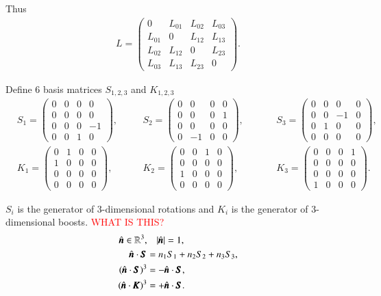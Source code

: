 Thus
\begin{align*}
   L = \begin{pmatrix} 0 & L_{01} & L_{02} & L_{03} \\ L_{01} & 0 & L_{12} & L_{13} \\ L_{02} & L_{12} & 0 & L_{23} \\ L_{03} & L_{13} & L_{23} & 0\end{pmatrix}.
\end{align*}

Define 6 basis matrices $S_{1,2,3}$ and $K_{1,2,3}$
\begin{align*}
   &S_1 = \begin{pmatrix} 0&0&0&0 \\ 0&0&0&0 \\ 0&0&0&-1 \\ 0&0&1&0\end{pmatrix}, \quad 
   &&S_2 = \begin{pmatrix} 0&0&0&0 \\ 0&0&0&1 \\ 0&0&0&0 \\ 0&-1&0&0\end{pmatrix}, \quad
   &&&S_3 = \begin{pmatrix} 0&0&0&0 \\ 0&0&-1&0 \\ 0&1&0&0 \\ 0&0&0&0\end{pmatrix}, \\
   &K_1 = \begin{pmatrix} 0&1&0&0 \\ 1&0&0&0 \\ 0&0&0&0 \\ 0&0&0&0\end{pmatrix}, \quad 
   &&K_2 = \begin{pmatrix} 0&0&1&0 \\ 0&0&0&0 \\ 1&0&0&0 \\ 0&0&0&0\end{pmatrix}, \quad 
   &&&K_3 = \begin{pmatrix} 0&0&0&1 \\ 0&0&0&0 \\ 0&0&0&0 \\ 1&0&0&0\end{pmatrix}. \quad 
\end{align*}

$S_i$ is the generator of $3$-dimensional rotations and $K_i$ is the generator of $3$-dimensional boosts. \textcolor{red}{WHAT IS THIS?}
\begin{align*}
   \hat{\pmb n} \in \mathbb{R}^3, & \quad |\hat{ \pmb n}| = 1, \\
   \hat{\pmb n} \cdot \pmb{S} &= n_1S_1 + n_2 S_2 + n_3 S_3, \\
   (\hat{\pmb n}\cdot \pmb{S})^3 &= - \hat{\pmb n} \cdot \pmb{S}, \\
   (\hat{\pmb n}\cdot \pmb{K})^3 &= + \hat{\pmb n} \cdot \pmb{S}.
\end{align*}

